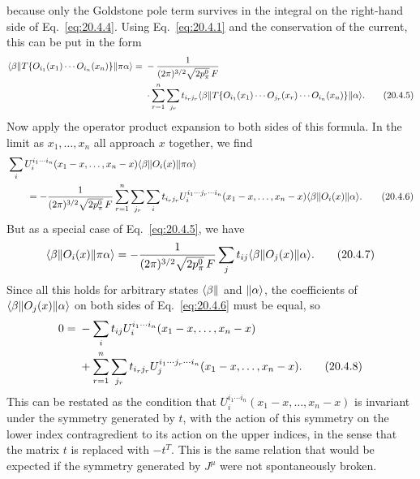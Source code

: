because only the Goldstone pole term survives in the integral on the right-hand side of Eq.~\eqref{eq:20.4.4}. Using Eq.~\eqref{eq:20.4.1} and the conservation of the current, this can be put in the form
\begin{align}
\langle \beta\rVert T\{O_{i_1}(x_1)\cdots O_{i_n}(x_n)\}\lVert \pi\alpha\rangle
={}&-\frac{1}{(2\pi)^{3/2}\sqrt{2p_\pi^0}\,F}
\notag\\
&\cdot
\sum_{r=1}^n\sum_{j_r}t_{i_rj_r}
\langle \beta\rVert T\{O_{i_1}(x_1)\cdots O_{j_r}(x_r)\cdots O_{i_n}(x_n)\}\lVert \alpha\rangle.
\tag{20.4.5}\label{eq:20.4.5}
\end{align}
Now apply the operator product expansion to both sides of this formula. In the limit as $x_1,\ldots,x_n$ all approach $x$ together, we find
\begin{align}
&\sum_i U_i^{i_1\cdots i_n}(x_1-x,\ldots,x_n-x)
\langle \beta\rVert O_i(x)\lVert \pi\alpha\rangle
\notag\\
&\qquad=-\frac{1}{(2\pi)^{3/2}\sqrt{2p_\pi^0}\,F}
\sum_{r=1}^n\sum_{j_r}\sum_i t_{i_rj_r}
U_i^{i_1\cdots j_r\cdots i_n}(x_1-x,\ldots,x_n-x)
\langle \beta\rVert O_i(x)\lVert \alpha\rangle.
\tag{20.4.6}\label{eq:20.4.6}
\end{align}
But as a special case of Eq.~\eqref{eq:20.4.5}, we have
\begin{equation}
\langle \beta\rVert O_i(x)\lVert \pi\alpha\rangle
=-\frac{1}{(2\pi)^{3/2}\sqrt{2p_\pi^0}\,F}
\sum_j t_{ij}\langle \beta\rVert O_j(x)\lVert \alpha\rangle.
\tag{20.4.7}\label{eq:20.4.7}
\end{equation}
Since all this holds for arbitrary states $\langle \beta\rVert$ and $\lVert \alpha\rangle$, the coefficients of $\langle \beta\rVert O_j(x)\lVert \alpha\rangle$ on both sides of Eq.~\eqref{eq:20.4.6} must be equal, so
\begin{align}
0={}&-\sum_i t_{ij}U_i^{i_1\cdots i_n}(x_1-x,\ldots,x_n-x)
\notag\\
&+\sum_{r=1}^n\sum_{j_r}t_{i_rj_r}
U_j^{i_1\cdots j_r\cdots i_n}(x_1-x,\ldots,x_n-x).
\tag{20.4.8}\label{eq:20.4.8}
\end{align}
This can be restated as the condition that $U_i^{i_1\cdots i_n}(x_1-x,\ldots,x_n-x)$ is invariant under the symmetry generated by $t$, with the action of this symmetry on the lower index contragredient to its action on the upper indices, in the sense that the matrix $t$ is replaced with $-t^T$. This is the same relation that would be expected if the symmetry generated by $J^\mu$ were not spontaneously broken.
